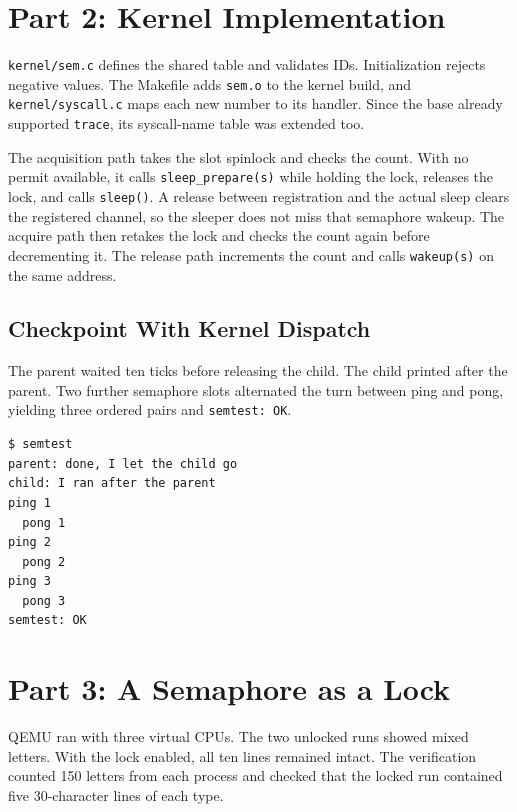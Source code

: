 \documentclass[12pt,a4paper]{article}
\begin{document}
\section{Part 2: Kernel Implementation}
\texttt{kernel/sem.c} defines the shared table and validates IDs. Initialization
rejects negative values. The Makefile adds \texttt{sem.o} to the kernel build,
and \texttt{kernel/syscall.c} maps each new number to its handler. Since the
base already supported \texttt{trace}, its syscall-name table was extended too.

The acquisition path takes the slot spinlock and checks the count. With no permit
available, it calls \texttt{sleep\_prepare(s)} while holding the lock, releases
the lock, and calls \texttt{sleep()}. A release between registration and the
actual sleep clears the registered channel, so the sleeper does not miss that
semaphore wakeup. The acquire path then retakes the lock and checks the count
again before decrementing it. The release path increments the count and calls
\texttt{wakeup(s)} on the same address.

\subsection{Checkpoint With Kernel Dispatch}
The parent waited ten ticks before releasing the child. The child printed after
the parent. Two further semaphore slots alternated the turn between ping and
pong, yielding three ordered pairs and \texttt{semtest: OK}.

\begin{lstlisting}[caption={Actual QEMU transcript after installing the handlers}]
$ semtest
parent: done, I let the child go
child: I ran after the parent
ping 1
  pong 1
ping 2
  pong 2
ping 3
  pong 3
semtest: OK
\end{lstlisting}

\section{Part 3: A Semaphore as a Lock}
QEMU ran with three virtual CPUs. The two unlocked runs showed mixed letters.
With the lock enabled, all ten lines remained intact. The verification counted
150 letters from each process and checked that the locked run contained five
30-character lines of each type.
\end{document}
